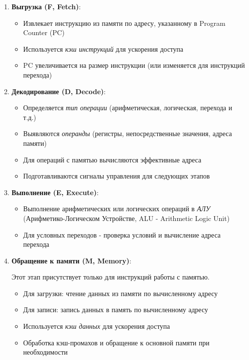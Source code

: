 \documentclass[12pt,a4paper]{article}
\begin{document}
\begin{enumerate}
    \item \textbf{Выгрузка (F, Fetch)}:
    \begin{itemize}
        \item Извлекает инструкцию из памяти по адресу, указанному в Program Counter (PC)
        \item Используется \textit{кэш инструкций} для ускорения доступа
        \item PC увеличивается на размер инструкции (или изменяется для инструкций перехода)
    \end{itemize}

    \item \textbf{Декодирование (D, Decode)}:
    \begin{itemize}
        \item Определяется \textit{тип операции} (арифметическая, логическая, перехода и т.д.)
        \item Выявляются \textit{операнды} (регистры, непосредственные значения, адреса памяти)
        \item Для операций с памятью вычисляются эффективные адреса
        \item Подготавливаются сигналы управления для следующих этапов
    \end{itemize}

    \item \textbf{Выполнение (E, Execute)}:
    \begin{itemize}
        \item Выполнение арифметических или логических операций в \textit{АЛУ} (Арифметико-Логическом Устройстве, ALU - Arithmetic Logic Unit)
        \item Для условных переходов - проверка условий и вычисление адреса перехода
    \end{itemize}

    \item \textbf{Обращение к памяти (M, Memory)}:
    
    Этот этап присутствует только для инструкций работы с памятью.
    \begin{itemize}
    \item Для загрузки: чтение данных из памяти по вычисленному адресу
    \item Для записи: запись данных в память по вычисленному адресу
    \item Используется \textit{кэш данных} для ускорения доступа
    \item Обработка кэш-промахов и обращение к основной памяти при необходимости
    \end{itemize}


\end{enumerate}
\end{document}

